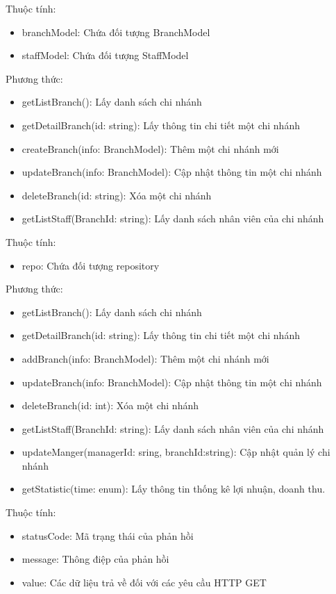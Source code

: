 Thuộc tính:
\begin{itemize}
	\item branchModel: Chứa đối tượng BranchModel
	\item staffModel: Chứa đối tượng StaffModel
\end{itemize}
Phương thức:
\begin{itemize}
	\item getListBranch(): Lấy danh sách chi nhánh
	\item getDetailBranch(id: string): Lấy thông tin chi tiết một chi nhánh
	\item createBranch(info: BranchModel): Thêm một chi nhánh mới
	\item updateBranch(info: BranchModel): Cập nhật thông tin một chi nhánh
	\item deleteBranch(id: string): Xóa một chi nhánh
	\item getListStaff(BranchId: string): Lấy danh sách nhân viên của chi nhánh
\end{itemize}

Thuộc tính:
\begin{itemize}
	\item repo: Chứa đối tượng repository
\end{itemize}
Phương thức:
\begin{itemize}
	\item getListBranch(): Lấy danh sách chi nhánh
	\item getDetailBranch(id: string): Lấy thông tin chi tiết một chi nhánh
	\item addBranch(info: BranchModel): Thêm một chi nhánh mới
	\item updateBranch(info: BranchModel): Cập nhật thông tin một chi nhánh
	\item deleteBranch(id: int): Xóa một chi nhánh
	\item getListStaff(BranchId: string): Lấy danh sách nhân viên của chi nhánh
	\item updateManger(managerId: sring, branchId:string): Cập nhật quản lý chi nhánh
	\item getStatistic(time: enum): Lấy thông tin thống kê lợi nhuận, doanh thu.
\end{itemize}

Thuộc tính:
\begin{itemize}
	\item statusCode: Mã trạng thái của phản hồi
	\item message: Thông điệp của phản hồi
	\item value: Các dữ liệu trả về đối với các yêu cầu HTTP GET
\end{itemize}

